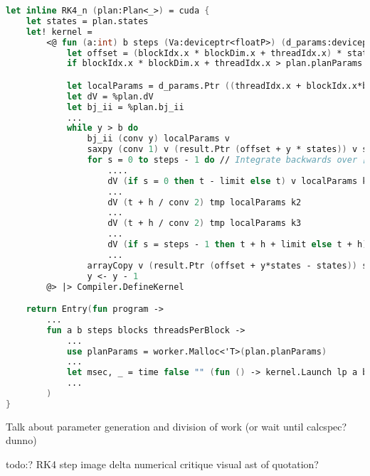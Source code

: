 \begin{table}[h!]
\centering
{}
\caption{F\# Alea.cuBase calculations per ms with double precision and parameters\label{table:cubaseManualParamsdoubletime}}
\end{table}

\begin{lstlisting}[language=FSharp, caption=Parameterized RK4\_n kernel in F\# Alea.cuBase, label=cubase_rk4nparams]
let inline RK4_n (plan:Plan<_>) = cuda {
    let states = plan.states
    let! kernel =
        <@ fun (a:int) b steps (Va:deviceptr<floatP>) (d_params:deviceptr<floatP>) (result:deviceptr<floatP>) ->
            let offset = (blockIdx.x * blockDim.x + threadIdx.x) * states * (a + 1)
            if blockIdx.x * blockDim.x + threadIdx.x > plan.planParams.Length/plan.paramCount then () else

            let localParams = d_params.Ptr ((threadIdx.x + blockIdx.x*blockDim.x)*plan.paramCount)
            let dV = %plan.dV
            let bj_ii = %plan.bj_ii
            ...
            while y > b do
                bj_ii (conv y) localParams v
                saxpy (conv 1) v (result.Ptr (offset + y * states)) v states
                for s = 0 to steps - 1 do // Integrate backwards over [y, y-1]
                    ....
                    dV (if s = 0 then t - limit else t) v localParams k1
                    ...
                    dV (t + h / conv 2) tmp localParams k2
                    ...
                    dV (t + h / conv 2) tmp localParams k3
                    ...
                    dV (if s = steps - 1 then t + h + limit else t + h) tmp localParams k4
                    ...
                arrayCopy v (result.Ptr (offset + y*states - states)) states
                y <- y - 1
        @> |> Compiler.DefineKernel 

    return Entry(fun program ->
        ...
        fun a b steps blocks threadsPerBlock ->
            ...
            use planParams = worker.Malloc<'T>(plan.planParams)
            ...
            let msec, _ = time false "" (fun () -> kernel.Launch lp a b steps Va.Ptr planParams.Ptr result.Ptr)
            ...
        )
}
\end{lstlisting}

Talk about parameter generation and division of work (or wait until calcspec? dunno)


todo:?
RK4 step image
delta numerical critique
visual ast of quotation?